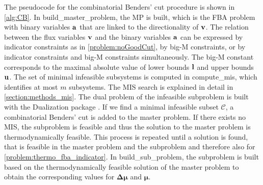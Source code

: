 The pseudocode for the combinatorial Benders' cut procedure is shown in \cref{alg:CB}. In \textsf{build\_master\_problem}, the MP is built, which is the FBA problem with binary variables $\bold a$ that are linked to the directionality of $\bold v$. The relation between the flux variables $\bold v$ and the binary variables $\bold a$ can be expressed by indicator constraints as in \cref{problem:noGoodCut}, by big-M constraints, or by indicator constraints and big-M constraints simultaneously. The big-M constant corresponds to the maximal absolute value of lower bounds $\bold l$ and upper bounds $\bold u$.
The set of minimal infeasible subsystems is computed in \textsf{compute\_mis}, which identifies at most $m$ subsystems. The MIS search is explained in detail in \cref{section:methods_mis}. The dual problem of the infeasible subproblem is built with the \textsf{Dualization} package \cite{dualization}.
If we find a minimal infeasible subset $\mathcal{C}$, a combinatorial Benders' cut is added to the master problem. If there exists no MIS, the subproblem is feasible and thus the solution to the master problem is thermodynamically feasible. 
This process is repeated until a solution is found, that is feasible in the master problem and the subproblem and therefore also for \cref{problem:thermo_fba_indicator}. In \textsf{build\_sub\_problem}, the subproblem is built based on the thermodynamically feasible solution of the master problem to obtain the corresponding values for $\boldsymbol{\Delta \mu}$ and $\boldsymbol \mu$. 

